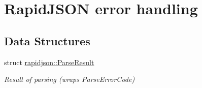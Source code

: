 \hypertarget{group___r_a_p_i_d_j_s_o_n___e_r_r_o_r_s}{}\section{Rapid\+J\+S\+ON error handling}
\label{group___r_a_p_i_d_j_s_o_n___e_r_r_o_r_s}
\subsection*{Data Structures}
\begin{DoxyCompactItemize}
\item 
struct \mbox{\hyperlink{structrapidjson_1_1_parse_result}{rapidjson\+::\+Parse\+Result}}
\begin{DoxyCompactList}\small\item\em Result of parsing (wraps Parse\+Error\+Code) \end{DoxyCompactList}\end{DoxyCompactItemize}
